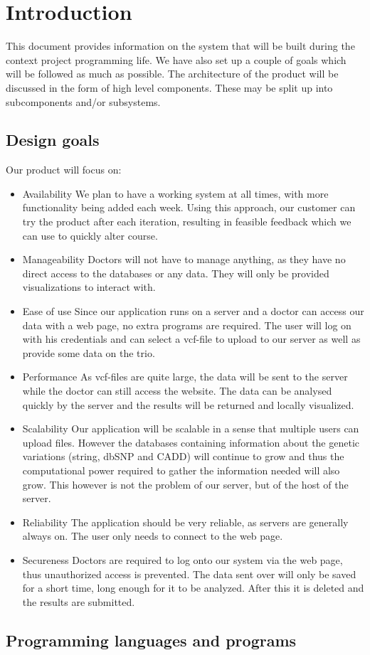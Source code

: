 \section{Introduction}
	This document provides information on the system that will be built during the context project programming life. We have also set up a couple of goals which will be followed as much as possible. The architecture of the product will be discussed in the form of high level components. These may be split up into subcomponents and/or subsystems.
	\subsection{Design goals}
	Our product will focus on:
	\begin{itemize}
		\item Availability
			\subitem We plan to have a working system at all times, with more functionality being added each week. Using this approach, our customer can try the product after each iteration, resulting in feasible feedback which we can use to quickly alter course.
		\item Manageability
			\subitem Doctors will not have to manage anything, as they have no direct access to the databases or any data. They will only be provided visualizations to interact with.
		\item Ease of use
			\subitem Since our application runs on a server and a doctor can access our data with a web page, no extra programs are required. The user will log on with his credentials and can select a vcf-file to upload to our server as well as provide some data on the trio.
		\item Performance
			\subitem As vcf-files are quite large, the data will be sent to the server while the doctor can still access the website. The data can be analysed quickly by the server and the results will be returned and locally visualized.
		\item Scalability
			\subitem Our application will be scalable in a sense that multiple users can upload files. However the databases containing information about the genetic variations (string, dbSNP and CADD) will continue to grow and thus the computational power required to gather the information needed will also grow. This however is not the problem of our server, but of the host of the server.
		\item Reliability
			\subitem The application should be very reliable, as servers are generally always on. The user only needs to connect to the web page.
		\item Secureness
			\subitem Doctors are required to log onto our system via the web page, thus unauthorized access is prevented. The data sent over will only be saved for a short time, long enough for it to be analyzed. After this it is deleted and the results are submitted.
	\end{itemize}
	\subsection{Programming languages and programs}